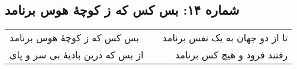 \begin{center}
\section*{شماره ۱۴: بس کس که ز کوچۀ هوس برنامد}
\label{sec:014}
\begin{longtable}{l p{0.5cm} r}
بس کس که ز کوچهٔ هوس برنامد
&&
تا از دو جهان به یک نفس برنامد
\\
از بس که درین بادیهٔ بی سر و پای
&&
رفتند فرود و هیچ کس برنامد
\\
\end{longtable}
\end{center}
